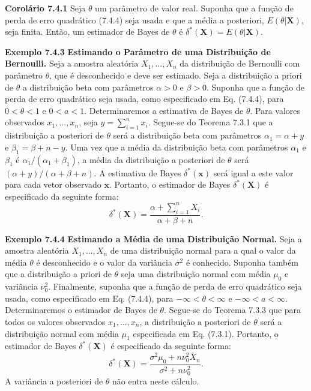 \vspace{1cm}
\noindent\textbf{Corolário 7.4.1} \quad Seja $\theta$ um parâmetro de valor real. Suponha que a função de perda de erro quadrático (7.4.4) seja usada e que a média a posteriori, $E(\theta|\mathbf{X})$, seja finita. Então, um estimador de Bayes de $\theta$ é $\delta^*(\mathbf{X}) = E(\theta|\mathbf{X})$.

\vspace{1cm}
\noindent\textbf{Exemplo 7.4.3} \quad \textbf{Estimando o Parâmetro de uma Distribuição de Bernoulli.} Seja a amostra aleatória $X_1, \dots, X_n$ da distribuição de Bernoulli com parâmetro $\theta$, que é desconhecido e deve ser estimado. Seja a distribuição a priori de $\theta$ a distribuição beta com parâmetros $\alpha>0$ e $\beta>0$. Suponha que a função de perda de erro quadrático seja usada, como especificado em Eq. (7.4.4), para $0<\theta<1$ e $0<a<1$. Determinaremos a estimativa de Bayes de $\theta$.
Para valores observados $x_1, \dots, x_n$, seja $y=\sum_{i=1}^{n}x_i$. Segue-se do Teorema 7.3.1 que a distribuição a posteriori de $\theta$ será a distribuição beta com parâmetros $\alpha_1=\alpha+y$ e $\beta_1=\beta+n-y$. Uma vez que a média da distribuição beta com parâmetros $\alpha_1$ e $\beta_1$ é $\alpha_1/(\alpha_1+\beta_1)$, a média da distribuição a posteriori de $\theta$ será $(\alpha+y)/(\alpha+\beta+n)$. A estimativa de Bayes $\delta^*(\mathbf{x})$ será igual a este valor para cada vetor observado $\mathbf{x}$. Portanto, o estimador de Bayes $\delta^*(\mathbf{X})$ é especificado da seguinte forma:
\begin{equation}
\delta^*(\mathbf{X}) = \frac{\alpha+\sum_{i=1}^{n}X_i}{\alpha+\beta+n}. \tag{7.4.5}
\end{equation}

\noindent\textbf{Exemplo 7.4.4} \quad \textbf{Estimando a Média de uma Distribuição Normal.} Seja a amostra aleatória $X_1, \dots, X_n$ de uma distribuição normal para a qual o valor da média $\theta$ é desconhecido e o valor da variância $\sigma^2$ é conhecido. Suponha também que a distribuição a priori de $\theta$ seja uma distribuição normal com média $\mu_0$ e variância $\nu_0^2$. Finalmente, suponha que a função de perda de erro quadrático seja usada, como especificado em Eq. (7.4.4), para $-\infty<\theta<\infty$ e $-\infty<a<\infty$. Determinaremos o estimador de Bayes de $\theta$.
Segue-se do Teorema 7.3.3 que para todos os valores observados $x_1, \dots, x_n$, a distribuição a posteriori de $\theta$ será a distribuição normal com média $\mu_1$ especificada em Eq. (7.3.1). Portanto, o estimador de Bayes $\delta^*(\mathbf{X})$ é especificado da seguinte forma:
\begin{equation}
\delta^*(\mathbf{X}) = \frac{\sigma^2\mu_0+n\nu_0^2\bar{X}_n}{\sigma^2+n\nu_0^2}. \tag{7.4.6}
\end{equation}
A variância a posteriori de $\theta$ não entra neste cálculo.

